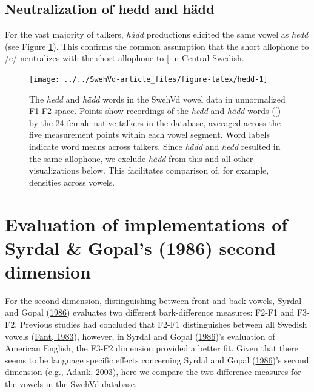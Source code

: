\documentclass[utf8]{frontiers_suppmat} %
\begin{document}
\hypertarget{sec:neutralize}{%
\subsection{Neutralization of hedd and hädd}\label{sec:neutralize}}

For the vast majority of talkers, \emph{hädd} productions elicited the same vowel as \emph{hedd} (see Figure \ref{fig:hedd}). This confirms the common assumption that the short allophone to /e/ neutralizes with the short allophone to {[}\ipatext{ɛ}{]} in Central Swedish.



\begin{figure}

{\centering \texttt{[image: ../../SwehVd-article\_files/figure-latex/hedd-1]} 

}

\caption{The \emph{hedd} and \emph{hädd} words in the SwehVd vowel data in unnormalized F1-F2 space. Points show recordings of the \emph{hedd} and \emph{hädd} words ({[}\ipatext{ɛ}{]}) by the 24 female native talkers in the database, averaged across the five measurement points within each vowel segment. Word labels indicate word means across talkers. Since \emph{hädd} and \emph{hedd} resulted in the same allophone, we exclude \emph{hädd} from this and all other visualizations below. This facilitates comparison of, for example, densities across vowels.}\label{fig:hedd}
\end{figure}

\hypertarget{sec:SG-eval}{%
\section{Evaluation of implementations of Syrdal \& Gopal's (1986) second dimension}\label{sec:SG-eval}}

For the second dimension, distinguishing between front and back vowels, Syrdal and Gopal (\protect\hyperlink{ref-Syrdal1986}{1986}) evaluates two different bark-difference measures: F2-F1 and F3-F2. Previous studies had concluded that F2-F1 distinguishes between all Swedish vowels (\protect\hyperlink{ref-fant1983}{Fant, 1983}), however, in Syrdal and Gopal (\protect\hyperlink{ref-Syrdal1986}{1986})'s evaluation of American English, the F3-F2 dimension provided a better fit. Given that there seems to be language specific effects concerning Syrdal and Gopal (\protect\hyperlink{ref-Syrdal1986}{1986})'s second dimension (e.g., \protect\hyperlink{ref-adank2003}{Adank, 2003}), here we compare the two difference measures for the vowels in the SwehVd database.
\end{document}
